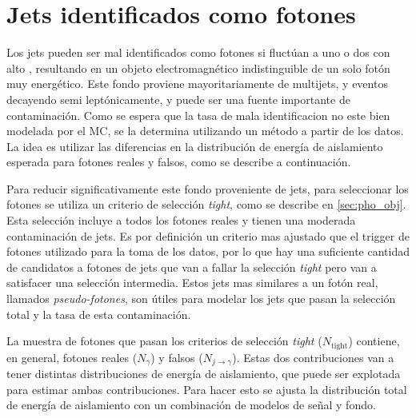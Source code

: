 \section{Jets identificados como fotones} \label{sec:jetfakes}

Los jets pueden ser mal identificados como fotones si fluctúan a uno o dos
{\pizero} con alto \pt, resultando en un objeto electromagnético indistinguible
de un solo fotón muy energético. Este fondo proviene mayoritariamente de
multijets, {\wjets} y eventos {\ttbar} decayendo semi leptónicamente, y puede
ser una fuente importante de contaminación. Como se espera que la tasa de mala
identificacion no este bien modelada por el MC, se la determina utilizando un
método a partir de los datos. La idea es utilizar las diferencias en la
distribución de energía de aislamiento esperada para fotones reales y falsos,
como se describe a continuación.

Para reducir significativamente este fondo proveniente de jets, para seleccionar
los fotones se utiliza un criterio de selección \emph{tight}, como se describe en
\cref{sec:pho_obj}. Esta selección incluye a todos los fotones reales y tienen
una moderada contaminación de jets. Es por definición un criterio mas ajustado
que el trigger de fotones utilizado para la toma de los datos, por lo que hay
una suficiente cantidad de candidatos a fotones de jets que van a fallar la
selección \emph{tight} pero van a satisfacer una selección intermedia. Estos
jets mas similares a un fotón real, llamados \emph{pseudo-fotones}, son útiles
para modelar los jets que pasan la selección total y la tasa de esta
contaminación.


La muestra de fotones que pasan los criterios de selección \emph{tight}
($N_\text{tight}$) contiene, en general, fotones reales ($N_{\gamma}$) y falsos
($N_{j\to\gamma}$). Estas dos contribuciones van a tener distintas
distribuciones de energía de aislamiento, que puede ser explotada para estimar
ambas contribuciones. Para hacer esto se ajusta la distribución total de energía
de aislamiento con un combinación de modelos de señal y fondo.


